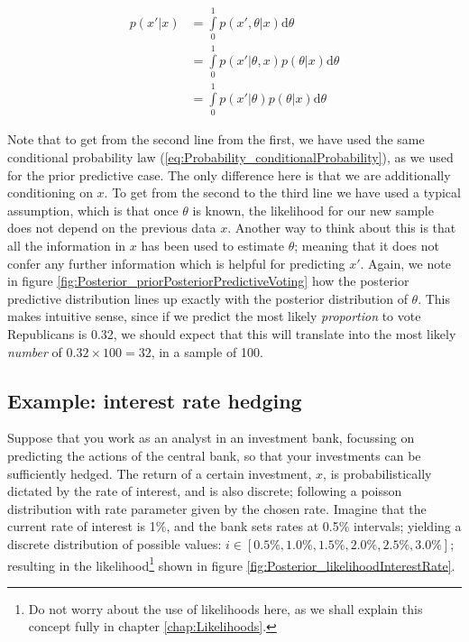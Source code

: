\documentclass[11pt,fullpage]{book}
\begin{document}
\begin{equation}\label{eq:Posterior_posteriorPredictiveVoting}
\begin{align}
p(x'|x) &= \int\limits_{0}^{1} p(x',\theta|x) \mathrm{d}\theta\\
&= \int\limits_{0}^{1} p(x'|\theta,x) p(\theta|x) \mathrm{d}\theta\\
&= \int\limits_{0}^{1} p(x'|\theta) p(\theta|x) \mathrm{d}\theta
\end{align}
\end{equation}

Note that to get from the second line from the first, we have used the same conditional probability law  (\ref{eq:Probability_conditionalProbability}), as we used for the prior predictive case. The only difference here is that we are additionally conditioning on $x$. To get from the second to the third line we have used a typical assumption, which is that once $\theta$ is known, the likelihood for our new sample does not depend on the previous data $x$. Another way to think about this is that all the information in $x$ has been used to estimate $\theta$; meaning that it does not confer any further information which is helpful for predicting $x'$. Again, we note in figure \ref{fig:Posterior_priorPosteriorPredictiveVoting} how the posterior predictive distribution lines up exactly with the posterior distribution of $\theta$. This makes intuitive sense, since if we predict the most likely \textit{proportion} to vote Republicans is 0.32, we should expect that this will translate into the most likely \textit{number} of $0.32\times 100=32$, in a sample of 100.

\subsection{Example: interest rate hedging}
Suppose that you work as an analyst in an investment bank, focussing on predicting the actions of the central bank, so that your investments can be sufficiently hedged. The return of a certain investment, $x$, is probabilistically dictated by the rate of interest, and is also discrete; following a poisson distribution with rate parameter given by the chosen rate. Imagine that the current rate of interest is 1\%, and the bank sets rates at 0.5\% intervals; yielding a discrete distribution of possible values: $i\in[0.5\%, 1.0\%, 1.5\%, 2.0\%, 2.5\%,3.0\% ]$; resulting in the likelihood\footnote{Do not worry about the use of likelihoods here, as we shall explain this concept fully in chapter \ref{chap:Likelihoods}.} shown in figure \ref{fig:Posterior_likelihoodInterestRate}.
\end{document}
